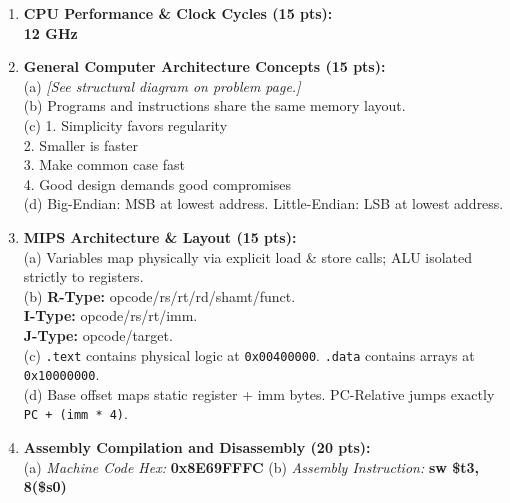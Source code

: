 \documentclass[letterpaper]{report}
\begin{document}
\noindent
\begin{minipage}[t][7in][s]{0.48\textwidth}
\begin{enumerate}[\bf 1.]
    \item \textbf{CPU Performance \& Clock Cycles (15 pts):} \\
    {\color{red} \textbf{12 GHz}}
    \vfill
    
    \item \textbf{General Computer Architecture Concepts (15 pts):} \\
    (a) \textit{[See structural diagram on problem page.]} \\
    (b) {\color{red} Programs and instructions share the same memory layout.} \\
    (c) {\color{red} 1. Simplicity favors regularity \\2. Smaller is faster \\3. Make common case fast \\4. Good design demands good compromises} \\
    (d) {\color{red} Big-Endian: MSB at lowest address. Little-Endian: LSB at lowest address.}
    \vfill
    
    \item \textbf{MIPS Architecture \& Layout (15 pts):} \\
    (a) {\color{red} Variables map physically via explicit load \& store calls; ALU isolated strictly to registers.} \\
    (b) {\color{red} \textbf{R-Type:} opcode/rs/rt/rd/shamt/funct. \\\textbf{I-Type:} opcode/rs/rt/imm. \\\textbf{J-Type:} opcode/target.} \\
    (c) {\color{red} \texttt{.text} contains physical logic at \texttt{0x00400000}. \texttt{.data} contains arrays at \texttt{0x10000000}.} \\
    (d) {\color{red} Base offset maps static register + imm bytes. PC-Relative jumps exactly \texttt{PC + (imm * 4)}.}
    \vfill
    
    \item \textbf{Assembly Compilation and Disassembly (20 pts):} \\
    (a) \textit{Machine Code Hex:} {\color{red} \textbf{0x8E69FFFC}} \hfill (b) \textit{Assembly Instruction:} {\color{red} \textbf{sw \$t3, 8(\$s0)}}
    \vfill
\end{enumerate}
\end{minipage}%
\hfill
\end{document}

